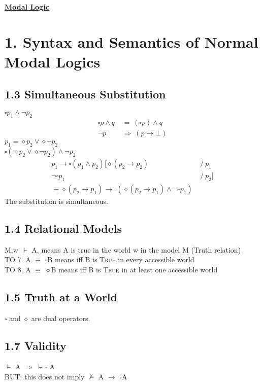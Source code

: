 \documentclass{report}
\begin{document}
\begin{center}
\huge{\textbf{\underline{Modal Logic}}}
\end{center}
 
{\let\clearpage\relax \chapter*{1. Syntax and Semantics of Normal Modal Logics}}
\section*{1.3 Simultaneous Substitution}
$\square p_1 \wedge \neg p_2$
\begin{align*}
	\square p \wedge q \ & = \ (\square p) \wedge q \\
	\neg p \ & \Rightarrow \ (p \rightarrow \bot)
\end{align*}
$p_1 = \diamond p_2 \vee \diamond \neg p_2$ \\
$\square (\diamond p_2 \vee \diamond \neg p_2 ) \wedge \neg p_2$ \\
\begin{align*}
	p_1 \rightarrow \square (p_1 \wedge p_2)
	[\diamond (p_2 \rightarrow p_2) \ & / \ p_1 \\
	\neg \square p_1 \ & / \ p_2 ] \\
	\equiv \diamond  (p_2 \rightarrow p_1) \rightarrow \square (\diamond (p_2 \rightarrow p_1) \wedge \neg \square p_1) \ 
\end{align*}
The substitution is simultaneous.
\section*{1.4 Relational Models}
M,w $\Vdash$ A, means A is true in the world w in the model M (Truth relation) \\
TO 7. A $\equiv$ $\square$B means iff B is \textsc{True} in every accessible world \\
TO 8. A $\equiv$ $\diamond$B means iff B is \textsc{True} in at least one accessible world
\section*{1.5 Truth at a World}
$\square$ and $\diamond$ are dual operators.
\section*{1.7 Validity}
$\models$ A $\Rightarrow$ $\models \square$ A \\
BUT: this does not imply $\not \models$ A $\rightarrow$ $\square$A
\end{document}
